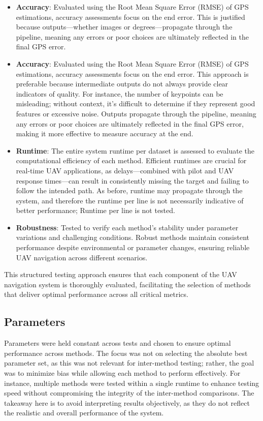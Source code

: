 \begin{itemize}
    \item \textbf{Accuracy}: Evaluated using the Root Mean Square Error (RMSE) of GPS estimations, accuracy assessments focus on the end error. This is justified because outputs—whether images or degrees—propagate through the pipeline, meaning any errors or poor choices are ultimately reflected in the final GPS error.
    \item \textbf{Accuracy}: Evaluated using the Root Mean Square Error (RMSE) of GPS estimations, accuracy assessments focus on the end error. This approach is preferable because intermediate outputs do not always provide clear indicators of quality. For instance, the number of keypoints can be misleading; without context, it's difficult to determine if they represent good features or excessive noise. Outputs propagate through the pipeline, meaning any errors or poor choices are ultimately reflected in the final GPS error, making it more effective to measure accuracy at the end.
    \item \textbf{Runtime}: The entire system runtime per dataset is assessed to evaluate the computational efficiency of each method. Efficient runtimes are crucial for real-time UAV applications, as delays—combined with pilot and UAV response times—can result in consistently missing the target and failing to follow the intended path. As before, runtime may propagate through the system, and therefore the runtime per line is not necessarily indicative of better performance; Runtime per line is not tested. 
    \item \textbf{Robustness}: Tested to verify each method's stability under parameter variations and challenging conditions. Robust methods maintain consistent performance despite environmental or parameter changes, ensuring reliable UAV navigation across different scenarios.
\end{itemize}

This structured testing approach ensures that each component of the UAV navigation system is thoroughly evaluated, facilitating the selection of methods that deliver optimal performance across all critical metrics.

\subsection{Parameters}  
Parameters were held constant across tests and chosen to ensure optimal performance across methods. The focus was not on selecting the absolute best parameter set, as this was not relevant for inter-method testing; rather, the goal was to minimize bias while allowing each method to perform effectively. For instance, multiple methods were tested within a single runtime to enhance testing speed without compromising the integrity of the inter-method comparisons. The takeaway here is to avoid interpreting results objectively, as they do not reflect the realistic and overall performance of the system.



